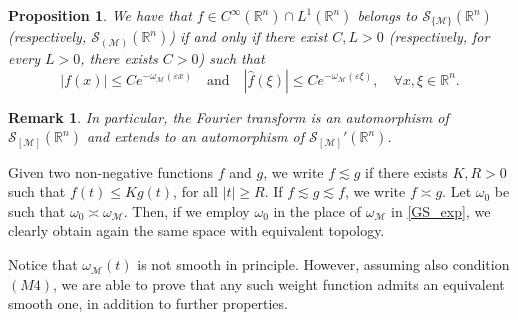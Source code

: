 \documentclass[11pt,reqno]{amsart}
\numberwithin{equation}{section}
\newtheorem{proposition}[theorem]{Proposition}
\newtheorem{remark}[theorem]{Remark}
\newcommand{\R}{{\mathbb{R}}} %
\newcommand{\caS}{{\mathcal{S}}}
\newcommand{\M}{{\mathcal{M}}} %
\begin{document}
\begin{proposition}
	We have that $f\in C^\infty(\R^n)\cap L^1(\R^n)$ belongs to $\caS_{\{\M\}}(\R^n)$ (respectively, $\caS_{(\M)}(\R^n)$) if and only if there exist $C,L>0$ (respectively, for every $L>0$, there exists $C>0$) such that
	\[|f(x)|\leq Ce^{-\omega_\M(\varepsilon x)}\quad \text{and}\quad |\widehat{f}(\xi)|\leq Ce^{-\omega_\M(\varepsilon\xi)},\quad \forall x,\xi\in\R^n.\]
\end{proposition}

\begin{remark}
	In particular, the Fourier transform is an automorphism of $\caS_{[\M]}(\R^n)$ and extends to an automorphism of $\caS_{[\M]}'(\R^n)$.
\end{remark}


Given two non-negative functions $f$ and $g$, we write $f\lesssim g$ if there exists $K,R>0$ such that $f(t) \leq Kg(t)$, for all $|t|\geq R$. If $f\lesssim g\lesssim f$, we write $f\asymp g$. Let $\omega_0$ be such that $\omega_0\asymp\omega_\M$. Then, if we employ $\omega_0$ in the place of $\omega_\M$ in \eqref{GS_exp}, we clearly obtain again the same space with equivalent topology.

Notice that $\omega_\M(t)$ is not smooth in principle. However, assuming also condition $(M4)$, we are able to prove that any such weight function admits
an equivalent smooth one, in addition to further properties.
\end{document}
